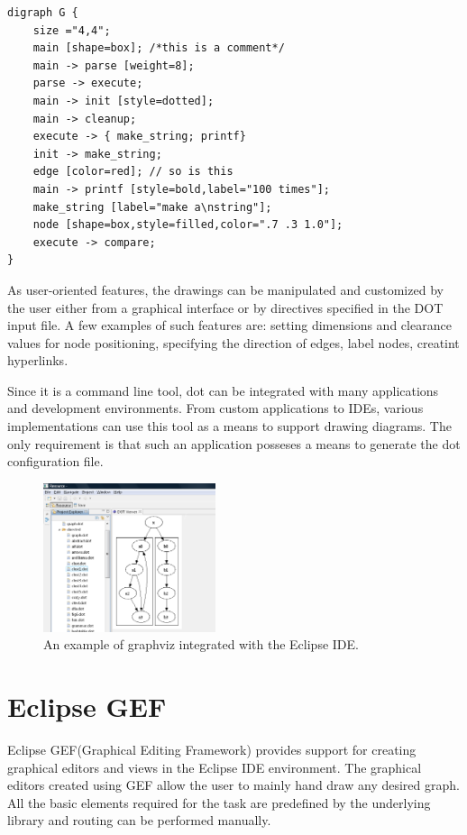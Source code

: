 \begin{lstlisting}[caption={Customized graph dot file representation, as can be seen in the official documentation}]
digraph G {
	size ="4,4";
	main [shape=box]; /*this is a comment*/
	main -> parse [weight=8];
	parse -> execute;
	main -> init [style=dotted];
	main -> cleanup;
	execute -> { make_string; printf}
	init -> make_string;
	edge [color=red]; // so is this
	main -> printf [style=bold,label="100 times"];
	make_string [label="make a\nstring"];
	node [shape=box,style=filled,color=".7 .3 1.0"];
	execute -> compare;
}
\end{lstlisting}

As user-oriented features, the drawings can be manipulated and customized by the user either from a graphical 
interface or by directives specified in the DOT input file. A few examples of such features are: setting dimensions 
and clearance values for node positioning, specifying the direction of edges, label nodes, creatint hyperlinks.

Since it is a command line tool, dot can be integrated with many applications and development environments. From 
custom applications to IDEs, various implementations can use this tool as a means to support drawing diagrams. The 
only requirement is that such an application posseses a means to generate the dot configuration file.

\begin{figure}[ht] \centering
\includegraphics[width=0.45\textwidth]{img/relatedwork/graphviz.png}
\caption{An example of graphviz integrated with the Eclipse IDE.\protect\footnotemark} \end{figure}

\section{Eclipse GEF}

Eclipse GEF(Graphical Editing Framework) provides support for creating graphical editors and views in the Eclipse IDE environment\cite{eclipse2007relwork}. The graphical 
editors created using GEF allow the user to mainly hand draw any desired graph. All the basic elements required for the task are predefined 
by the underlying library and routing can be performed manually.

